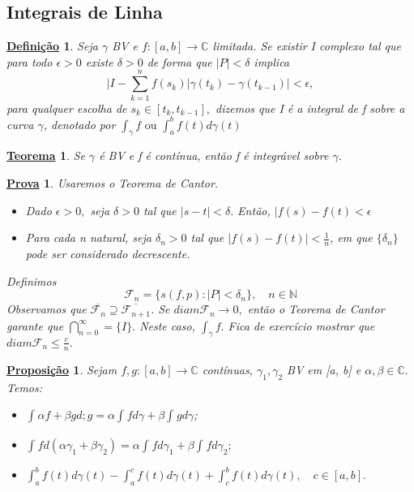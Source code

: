 \documentclass{article}
\newtheorem*{def*}{\underline{Defini\c c\~ao}}
\newtheorem*{theorem*}{\underline{Teorema}}
\newtheorem*{proof*}{\underline{Prova}}
\newtheorem*{prop*}{\underline{Proposi\c c\~ao}}
\begin{document}
\subsection{Integrais de Linha}
\begin{def*}
  Seja $\gamma$ BV e $f:[a, b]\rightarrow \mathbb{C}$ limitada. Se existir I complexo tal que para todo $\epsilon > 0$ existe $\delta > 0$
de forma que $|P| < \delta$ implica
  $$
    \biggl|I - \sum\limits_{k=1}^{n}f(s_{k})|\gamma(t_{k}) - \gamma(t_{k-1})\biggr| < \epsilon,
  $$
  para qualquer escolha de $s_{k}\in{[t_{k}, t_{k-1}]},$ dizemos que I \'e a integral de f sobre a curva $\gamma$, denotado por
  $\int_{\gamma}^{}f\text{ ou } \int_{a}^{b}f(t)d\gamma(t)$
\end{def*}
 \begin{theorem*}
   Se $\gamma$ \'e BV e f \'e cont\'inua, ent\~ao f \'e integr\'avel sobre $\gamma.$
 \end{theorem*}
\begin{proof*}
  Usaremos o Teorema de Cantor.
 \begin{itemize}
   \item[1)] Dado $\epsilon > 0,$ seja $\delta > 0$ tal que $|s-t| < \delta.$ Ent\~ao, $|f(s) - f(t) < \epsilon$
   \item[2)] Para cada n natural, seja $\delta_{n} > 0$ tal que $|f(s) - f(t)| < \frac{1}{n}$, em que $\{\delta_{n}\}$ pode ser 
  considerado decrescente. 
 \end{itemize}

  Definimos 
    $$
    \mathcal{F}_{n} = \{s(f, p): |P| < \delta_{n}\}, \quad n\in \mathbb{N}
    $$
    Observamos que  $\overline{\mathcal{F}_{n}}\supseteq\overline{\mathcal{F}_{n+1}}$. Se $diam \mathcal{F}_{n}\to{0},$ ent\~ao
  o Teorema de Cantor garante que $\bigcap_{n=0}^{\infty} = \{I\}.$ Neste caso, $\int_{\gamma}^{}f.$ Fica de exerc\'icio mostrar que
  $diam \mathcal{F}_{n}\leq \frac{c}{n}.$
\end{proof*}
 \begin{prop*}
   Sejam $f, g:[a, b]\rightarrow \mathbb{C}$ cont\'inuas, $\gamma_{1}, \gamma_2$ BV em [a, b] e $\alpha, \beta\in{\mathbb{C}}.$
Temos: 
 \begin{itemize}
   \item[i)] $\int_{}^{}\alpha f + \beta g d;g = \alpha \int_{}^{}fd \gamma + \beta \int_{}^{}gd \gamma$;
   \item[ii)] $\int_{}^{}f d(\alpha \gamma_1 + \beta \gamma_2) = \alpha\int_{}^{}f d \gamma_1 + \beta \int_{}^{}f d \gamma_2;$
   \item[iii)] $\int_{a}^{b}f(t)d \gamma(t) - \int_{a}^{c}f(t)d \gamma(t) + \int_{c}^{b}f(t) d \gamma(t), \quad c\in{[a, b]}.$
 \end{itemize}
 \end{prop*}
\end{document}
